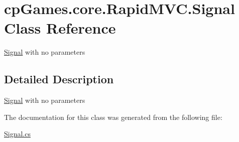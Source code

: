 \hypertarget{classcp_games_1_1core_1_1_rapid_m_v_c_1_1_signal}{}\section{cp\+Games.\+core.\+Rapid\+M\+V\+C.\+Signal Class Reference}
\label{classcp_games_1_1core_1_1_rapid_m_v_c_1_1_signal}


\mbox{\hyperlink{classcp_games_1_1core_1_1_rapid_m_v_c_1_1_signal}{Signal}} with no parameters  




\subsection{Detailed Description}
\mbox{\hyperlink{classcp_games_1_1core_1_1_rapid_m_v_c_1_1_signal}{Signal}} with no parameters 



The documentation for this class was generated from the following file\+:\begin{DoxyCompactItemize}
\item 
\mbox{\hyperlink{_signal_8cs}{Signal.\+cs}}\end{DoxyCompactItemize}
